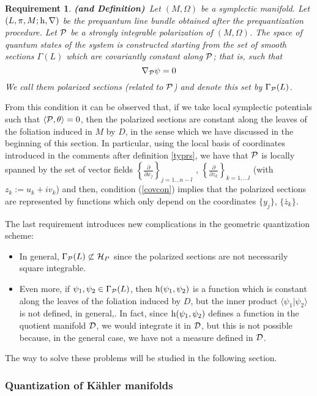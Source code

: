 \documentclass[12pt]{article}
\theoremstyle{plain}
\newtheorem{require}{Requirement}
\def\beq{\begin{equation}}
\def\eeq{\end{equation}}
\def\dst{\(}
\def\derpar#1#2{\frac{\partial{#1}}{\partial{#2}}}
\def\P{{\cal P}}
\def\D{{\cal D}}
\def\H{{\cal H}}
\def\h{{\rm h}}
\begin{document}
\begin{require}
{\bf (and Definition)}\
Let $(M,\Omega )$ be a symplectic manifold.
Let $(L,\pi ,M;\h ,\nabla )$ be the prequantum line bundle
obtained after the prequantization procedure.
Let $\P$ be a strongly integrable polarization
of $(M,\Omega )$.
The space of quantum states of the system
is constructed starting from the set of smooth sections $\Gamma (L)$
which are {\it covariantly constant} along $\P$;
that is, such that
\beq
\nabla_\P\psi = 0
\label{covcon}
\eeq
We call them
{\rm polarized sections} (related to $\P$)
and denote this set by $\Gamma_\P (L)$.
\label{polsec}
\end{require}

  From this condition it can be observed that,
if we take local symplectic potentials such that
$\langle \P , \theta \rangle = 0$,
then the polarized sections are constant
along the leaves of the foliation induced in $M$ by $D$,
in the sense which we have discussed in the beginning of this section.
In particular, using the local basis of coordinates introduced
in the comments after definition \ref{typrs},
we have that $\P$ is locally spanned by the set of vector fields
\dst\left\{ \derpar{}{x_j} \right\}_{j=1 \ldots n-l}\) ,
\dst\left\{ \derpar{}{z_k} \right\}_{k=1,\ldots l}\)
(with $z_k := u_k + i v_k$) and then,
condition (\ref{covcon}) implies that the polarized sections
are represented by functions which only depend on
the coordinates $\{ y_j \}$, $\{\bar z_k \}$.

The last requirement introduces new complications
in the geometric quantization scheme:
\begin{itemize}
\item
In general, $\Gamma_\P (L) \not\subset \H_P$
since the polarized sections are not necessarily square integrable.
\item
Even more, if
$\psi_1,\psi_2 \in \Gamma_\P (L)$,
then $\h (\psi_1,\psi_2)$ is a function which
is constant along the leaves of the foliation
induced by $D$, but the inner product
$\langle \psi_1 | \psi_2 \rangle$
is not defined, in general,.
In fact, since $\h (\psi_1,\psi_2)$
defines a function in the quotient manifold $\D$,
we would integrate it in $\D$,
but this is not possible because, in the general case, we have not
a measure defined in $\D$.
\end{itemize}
The way to solve these problems will be studied in the following
section.


\subsubsection{Quantization of K\"ahler manifolds}
\end{document}

